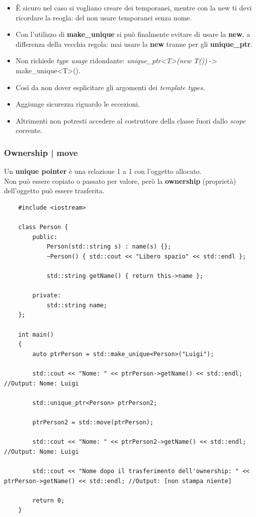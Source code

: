 \begin{itemize}
	\item \textsf{\small È sicuro nel caso si vogliano creare dei temporanei, mentre con la new ti devi ricordare la reogla: del non usare temporanei senza nome. } 
	\item \textsf{\small Con l'utilizzo di \textbf{make\_unique} si può finalmente evitare di usare la \textbf{new}, a differenza della vecchia regola: mai usare la \textbf{new} tranne per gli \textbf{unique\_ptr}.} 
	\item \textsf{\small Non richiede \emph{type usage} ridondante: \emph{unique\_ptr<T>(new T())} -> make\_unique<T>().} \\
	\item \textsf{\small Così da non dover esplicitare gli argomenti dei \emph{template types}.}
	\item \textsf{\small Aggiunge sicurezza riguardo le eccezioni.}
	\item \textsf{\small Altrimenti non potresti accedere al costruttore della classe fuori dallo \emph{scope} corrente.}
\end{itemize}

\subsubsection{Ownership | move}

\textsf{\small Un \textbf{unique pointer} è una relazione 1 a 1 con l'oggetto allocato.} \\

\textsf{\small Non può essere copiato o passato per valore, però la \textbf{ownership} (proprietà) dell'oggetto può essere trasferita.} \\

\begin{lstlisting}
	#include <iostream>
	
	class Person {
		public:
			Person(std::string s) : name(s) {};
			~Person() { std::cout << "Libero spazio" << std::endl };
			
			std::string getName() { return this->name };
			
		private:
			std::string name;
	};

	int main()
	{
		auto ptrPerson = std::make_unique<Person>("Luigi");
		
		std::cout << "Nome: " << ptrPerson->getName() << std::endl; //Output: Nome: Luigi
		
		std::unique_ptr<Person> ptrPerson2;
		
		ptrPerson2 = std::move(ptrPerson);
		
		std::cout << "Nome: " << ptrPerson2->getName() << std::endl; //Output: Nome: Luigi
		
		std::cout << "Nome dopo il trasferimento dell'ownership: " << ptrPerson->getName() << std::endl; //Output: [non stampa niente]
		
		return 0;
	}
\end{lstlisting}


